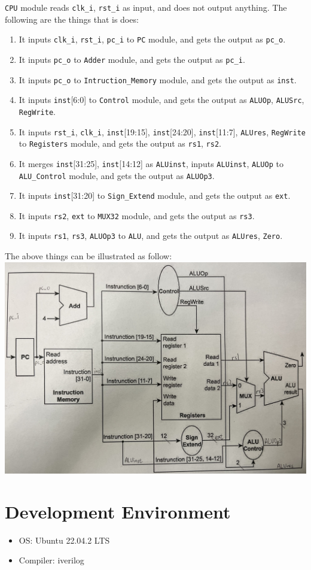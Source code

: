 \texttt{CPU} module reads \texttt{clk\_i}, \texttt{rst\_i} as input, and does not output anything. The following are the things that is does:
\begin{enumerate}
\item It inputs \texttt{clk\_i}, \texttt{rst\_i}, \texttt{pc\_i} to \texttt{PC} module, and gets the output as \texttt{pc\_o}.
\item It inputs \texttt{pc\_o} to \texttt{Adder} module, and gets the output as \texttt{pc\_i}.
\item It inputs \texttt{pc\_o} to \texttt{Intruction\_Memory} module, and gets the output as \texttt{inst}.
\item It inputs \texttt{inst}[6:0] to \texttt{Control} module, and gets the output as \texttt{ALUOp}, \texttt{ALUSrc}, \texttt{RegWrite}.
\item It inputs \texttt{rst\_i}, \texttt{clk\_i}, \texttt{inst}[19:15], \texttt{inst}[24:20], \texttt{inst}[11:7], \texttt{ALUres}, \texttt{RegWrite} to \texttt{Registers} module, and gets the output as \texttt{rs1}, \texttt{rs2}.
\item It merges \texttt{inst}[31:25], \texttt{inst}[14:12] as \texttt{ALUinst}, inputs \texttt{ALUinst}, \texttt{ALUOp} to \texttt{ALU\_Control} module, and gets the output as \texttt{ALUOp3}.
\item It inputs \texttt{inst}[31:20] to \texttt{Sign\_Extend} module, and gets the output as \texttt{ext}.
\item It inputs \texttt{rs2}, \texttt{ext} to \texttt{MUX32} module, and gets the output as \texttt{rs3}.
\item It inputs \texttt{rs1}, \texttt{rs3}, \texttt{ALUOp3} to \texttt{ALU}, and gets the output as \texttt{ALUres}, \texttt{Zero}.
\end{enumerate}

The above things can be illustrated as follow:\\
\includegraphics[width=15cm]{all.JPG}

\section{Development Environment}

\begin{itemize}
\item OS: Ubuntu 22.04.2 LTS
\item Compiler: iverilog
\end{itemize}
